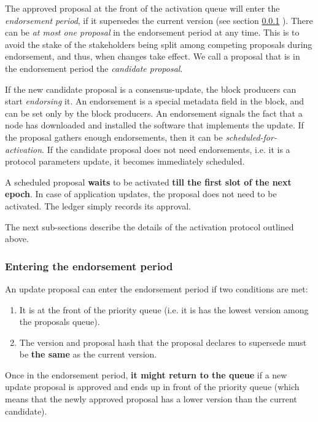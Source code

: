 The approved proposal at the front of the activation queue will enter the
\emph{endorsement period}, if it supersedes the current version (see section 
\ref{sec:entering-the-endorsement-phase} ).
%
There can be \emph{at most one proposal} in the endorsement period at any time.
%
This is to avoid the stake of the stakeholders being split among competing
proposals during endorsement, and thus, when changes take effect.
%
We call a proposal that is in the endorsement period the \emph{candidate
	proposal}.

If the new candidate proposal is a consensus-update, the block producers can
start \emph{endorsing} it. An endorsement is a special metadata field in the
block, and can be set only by the block producers. An endorsement signals the
fact that a node has downloaded and installed the software that implements the
update.
%
If the proposal gathers enough endorsements, then it can be
\emph{scheduled-for-activation}.
%
If the candidate proposal does not need endorsements, i.e. it is a protocol
parameters update, it becomes immediately scheduled.

A scheduled proposal \textbf{waits} to be activated \textbf{till the first slot
	of the next epoch}. In case of application updates, the proposal does not 
	need
to be activated. The ledger simply records its approval.

The next sub-sections describe the details of the activation protocol outlined
above.

\subsubsection{Entering the endorsement period}
\label{sec:entering-the-endorsement-phase}

An update proposal can enter the endorsement period if two conditions are met:
\begin{enumerate}
	\item It is at the front of the priority queue (i.e. it is has the lowest
	version among the proposals queue).
	\item The version and proposal hash that the proposal declares to supersede 
	must
	be \textbf{the same} as the current version.
\end{enumerate}
Once in the endorsement period, \textbf{it might return to the queue} if a new
update proposal is approved and ends up in front of the priority queue (which
means that the newly approved proposal has a lower version than the current
candidate).

